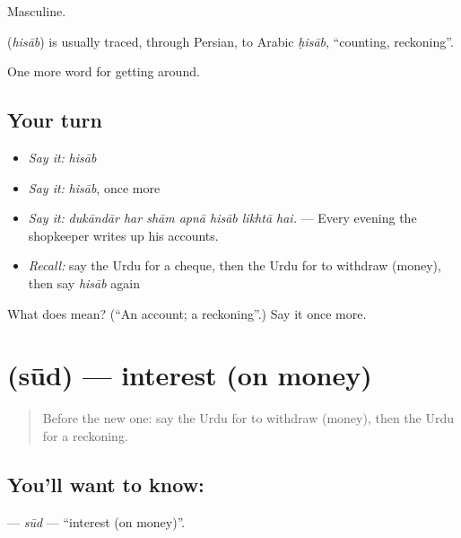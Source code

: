 Masculine.

\begin{cousinweb}
\textbf{} (\emph{hisāb}) is usually traced, through Persian, to Arabic \emph{ḥisāb}, \textquotedblleft{}counting, reckoning\textquotedblright{}.
\end{cousinweb}

\begin{grammarlens}[title={What you've built}]
One more word for getting around.
\end{grammarlens}

\subsection*{Your turn}
\begin{itemize}
\raggedright
  \item \emph{Say it:} \emph{hisāb}
  \item \emph{Say it:} \emph{hisāb}, once more
  \item \emph{Say it:} \emph{dukāndār har shām apnā hisāb likhtā hai.} — Every evening the shopkeeper writes up his accounts.
  \item \emph{Recall:} say the Urdu for a cheque, then the Urdu for to withdraw (money), then say \emph{hisāb} again
\end{itemize}

\begin{tcolorbox}[breakable,colback=teal!4,colframe=teal!35!black,title={Before you move on}]
What does  mean? (\textquotedblleft{}An account; a reckoning\textquotedblright{}.) Say it once more.
\end{tcolorbox}
\section[\texorpdfstring{\ur{سود} (sūd)}{سود (sūd)}]{ (sūd) — interest (on money)}

\label{lesson:UR-C418-sud}



\begin{quote}
Before the new one: say the Urdu for to withdraw (money), then the Urdu for a reckoning.
\end{quote}

\subsection*{You'll want to know: }
\textbf{} — \emph{sūd} — \textquotedblleft{}interest (on money)\textquotedblright{}.

